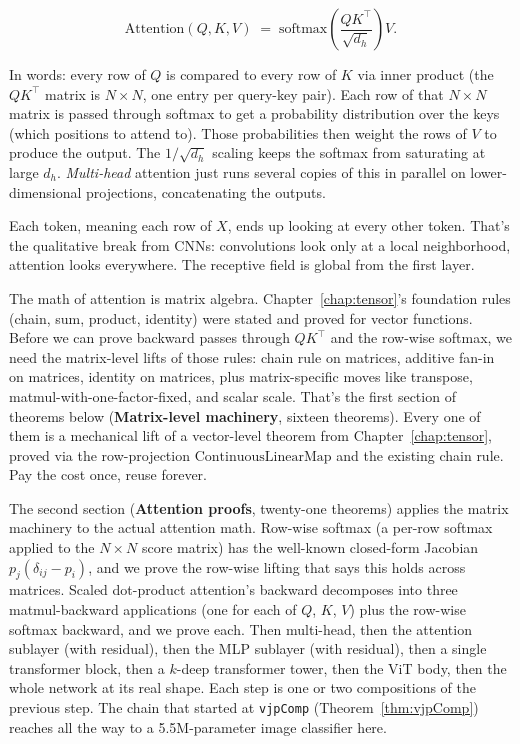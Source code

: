 \[
\mathrm{Attention}(Q, K, V) \;=\; \mathrm{softmax}\!\left(\frac{Q K^\top}{\sqrt{d_h}}\right) V.
\]

In words: every row of \(Q\) is compared to every row of \(K\) via
inner product (the \(QK^\top\) matrix is \(N \times N\), one
entry per query-key pair). Each row of that \(N \times N\) matrix
is passed through softmax to get a probability distribution over
the keys (which positions to attend to). Those probabilities then
weight the rows of \(V\) to produce the output. The
\(1 / \sqrt{d_h}\) scaling keeps the softmax from saturating at
large \(d_h\). \emph{Multi-head} attention just runs several copies
of this in parallel on lower-dimensional projections, concatenating
the outputs.

Each token, meaning each row of \(X\), ends up looking at every
other token. That's the qualitative break from CNNs:
convolutions look only at a local neighborhood, attention looks
everywhere. The receptive field is global from the first layer.


The math of attention is matrix algebra. Chapter~\ref{chap:tensor}'s
foundation rules (chain, sum, product, identity) were stated and
proved for vector functions. Before we can prove backward
passes through \(Q K^\top\) and the row-wise softmax, we need the
matrix-level lifts of those rules: chain rule on matrices,
additive fan-in on matrices, identity on matrices, plus matrix-specific
moves like transpose, matmul-with-one-factor-fixed, and scalar
scale. That's the first section of theorems below
(\textbf{Matrix-level machinery}, sixteen theorems). Every one of them
is a mechanical lift of a vector-level theorem from
Chapter~\ref{chap:tensor}, proved via the row-projection
\(\mathrm{ContinuousLinearMap}\) and the existing chain rule. Pay
the cost once, reuse forever.

The second section (\textbf{Attention proofs}, twenty-one theorems)
applies the matrix machinery to the actual attention math. Row-wise
softmax (a per-row softmax applied to the \(N \times N\) score
matrix) has the well-known closed-form Jacobian \(p_j(\delta_{ij}
- p_i)\), and we prove the row-wise lifting that says this holds
across matrices. Scaled dot-product attention's backward decomposes
into three matmul-backward applications (one for each of \(Q\),
\(K\), \(V\)) plus the row-wise softmax backward, and we prove each. Then
multi-head, then the attention sublayer (with residual), then the
MLP sublayer (with residual), then a single transformer block,
then a \(k\)-deep transformer tower, then the ViT body, then the whole
network at its real shape. Each step is one or two compositions of the
previous step. The chain
that started at \texttt{vjpComp} (Theorem~\ref{thm:vjpComp}) reaches all the way to a 5.5M-parameter image classifier here.

